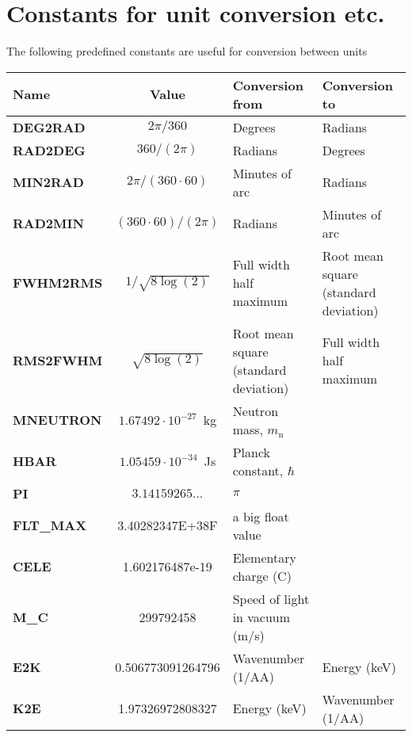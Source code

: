 \section{Constants for unit conversion etc.}
The following predefined constants are useful for conversion
between units
\def\textvb{\textbf}
\begin{center}
\begin{tabular}{|l|c|p{}|p{}|}
\hline
Name & Value & Conversion from & Conversion to \\ \hline
\textvb{DEG2RAD} & $2 \pi / 360$ & Degrees & Radians \\
\textvb{RAD2DEG} & $360 / (2 \pi)$ & Radians & Degrees \\
\textvb{MIN2RAD} & $2 \pi / (360 \cdot 60)$
  & Minutes of arc & Radians \\
\textvb{RAD2MIN} & $(360\cdot 60) / (2 \pi)$
  & Radians & Minutes of arc \\
\textvb{FWHM2RMS} & $1/\sqrt{8\log(2)}$
  & Full width half maximum & Root mean square (standard deviation) \\
\textvb{RMS2FWHM} & $\sqrt{8\log(2)}$
  & Root mean square (standard deviation) & Full width half maximum \\
\textvb{MNEUTRON} & $1.67492 \cdot 10^{-27}$~kg
  & Neutron mass, $m_\mathrm{n}$ & \\
\textvb{HBAR} & $1.05459 \cdot 10^{-34}$~Js
  & Planck constant, $\hbar$ & \\
\textvb{PI} & $3.14159265...$
  & $\pi$ & \\
\textvb{FLT\_MAX} & 3.40282347E+38F
  & a big float value & \\
\textvb{CELE} & 1.602176487e-19 & Elementary charge (C) &\\
\textvb{M\_C} & 299792458 & Speed of light in vacuum (m/s) &\\
\textvb{E2K} & 0.506773091264796 & Wavenumber (1/AA) & Energy (keV)\\
\textvb{K2E} & 1.97326972808327  & Energy (keV) & Wavenumber (1/AA)\\

\hline
\end{tabular}
\end{center}
